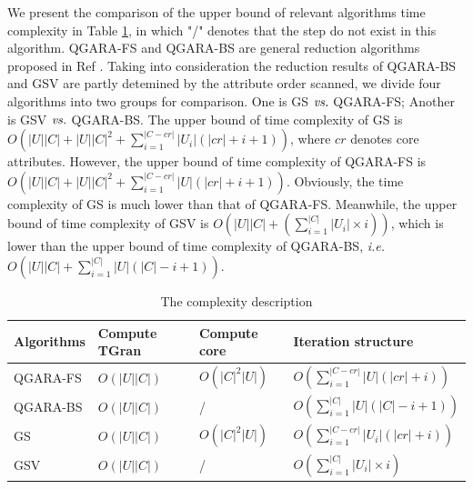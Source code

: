 \documentclass[review]{elsarticle}
\begin{document}
	\par We present the comparison of the upper bound of relevant algorithms time complexity in Table \ref{complexity}, in which "/" denotes that the step do not exist in this algorithm. QGARA-FS and QGARA-BS are general reduction algorithms proposed in Ref \cite{ge2017quick}. Taking into consideration the reduction results of QGARA-BS and GSV are partly detemined by the attribute order scanned, we divide four algorithms into two groups for comparison. One is GS $\emph{vs.}$ QGARA-FS; Another is GSV $\emph{vs.}$ QGARA-BS. The upper bound of time complexity of GS is $O(|U||C|+|U||C|^2+\sum_{i=1}^{|C-cr|}|U_i|(|cr|+i+1))$, where $cr$ denotes core attributes. However, the upper bound of time complexity of QGARA-FS is  $O(|U||C|+|U||C|^2+\sum_{i=1}^{|C-cr|}|U|(|cr|+i+1))$. Obviously, the time complexity of GS is much lower than that of QGARA-FS. Meanwhile, the upper bound of time complexity of GSV is $O(|U||C|+(\sum_{i=1}^{|C|}|U_i|\times i))$, which is lower than the upper bound of time complexity of QGARA-BS, \emph{i.e.} $O(|U||C|+\sum_{i=1}^{|C|}|U|(|C|-i+1))$.
	\begin{table}[htbp]
		\caption{The complexity description}
		\label{complexity}
		\begin{tabular}{llll}
			\hline
			Algorithms   & Compute TGran					 & Compute core                      & Iteration structure                                            \\ \hline
			QGARA-FS     & $O(|U||C|)$ 			             & $O(|C|^2|U|)$                     & $O(\sum_{i=1}^{|C-cr|}|U|(|cr|+i))$                       \\
			QGARA-BS     & $O(|U||C|)$ 			             & /                                 & $O(\sum_{i=1}^{|C|}|U|(|C|-i+1))$                              \\
			GS           & $O(|U||C|)$                       & $O(|C|^2|U|)$					 & $O(\sum_{i=1}^{|C-cr|}|U_i|(|cr|+i))$				 	  \\
			GSV			 & $O(|U||C|)$                       & /                                 & $O(\sum_{i=1}^{|C|}|U_i|\times i)$       				 	  \\ \hline
		\end{tabular}
	\end{table}
	
\end{document}
